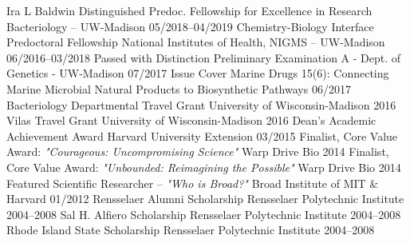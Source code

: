 

\begin{cvhonors}
  \cvhonor
    {Ira L Baldwin Distinguished Predoc. Fellowship for Excellence in Research} %
    {Bacteriology -- UW-Madison} %
    {05/2018--04/2019} %
  \cvhonor
    {Chemistry-Biology Interface Predoctoral Fellowship} %
    {National Institutes of Health, NIGMS -- UW-Madison} %
    {06/2016--03/2018} %
  \cvhonor
    {Passed with Distinction} %
    {Preliminary Examination A - Dept. of Genetics - UW-Madison} %
    {07/2017} %
  \cvhonor
    {Issue Cover} %
    {Marine Drugs 15(6): Connecting Marine Microbial Natural Products to Biosynthetic Pathways} %
    {06/2017} %
  \cvhonor
    {Bacteriology Departmental Travel Grant} %
    {University of Wisconsin-Madison} %
    {2016} %
  \cvhonor
    {Vilas Travel Grant} %
    {University of Wisconsin-Madison} %
    {2016} %
  \cvhonor
    {Dean's Academic Achievement Award} %
    {Harvard University Extension} %
    {03/2015} %
  \cvhonor
    {Finalist, Core Value Award: \textit{"Courageous: Uncompromising Science"}} %
    {Warp Drive Bio} %
    {2014} %
  \cvhonor
    {Finalist, Core Value Award: \textit{"Unbounded: Reimagining the Possible"}} %
    {Warp Drive Bio} %
    {2014} %
  \cvhonor
    {Featured Scientific Researcher -- \textit{"Who is Broad?"}} %
    {Broad Institute of MIT \& Harvard} %
    {01/2012} %
  \cvhonor
    {Rensselaer Alumni Scholarship} %
    {Rensselaer Polytechnic Institute} %
    {2004--2008} %
  \cvhonor
    {Sal H. Alfiero Scholarship} %
    {Rensselaer Polytechnic Institute} %
    {2004--2008} %
  \cvhonor
    {Rhode Island State Scholarship} %
    {Rensselaer Polytechnic Institute} %
    {2004--2008} %
\end{cvhonors}